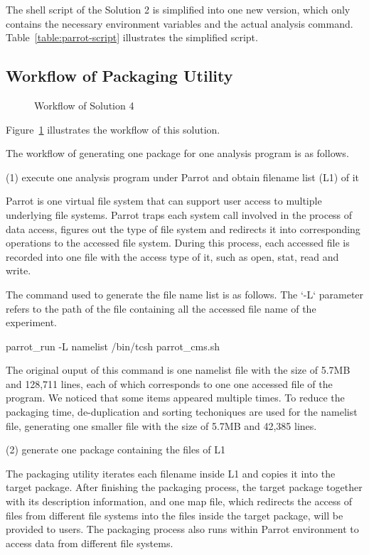 \documentclass{acm_proc_article-sp}
\begin{document}
The shell script of the Solution 2 is simplified into one new version, which
only contains the necessary environment variables and the
actual analysis command. Table~\ref{table:parrot-script} illustrates
the simplified script.

\subsection{Workflow of Packaging Utility}
\begin{figure}
\centering
{}
\caption{Workflow of Solution 4}
\label{fig:workflow-parrot}
\end{figure}

Figure~\ref{fig:workflow-parrot} illustrates the workflow of this solution.

The workflow of generating one package for one analysis program is as follows.

(1) execute one analysis program under Parrot and obtain filename list (L1) of it

Parrot is one virtual file system that can support user access to multiple underlying file systems. Parrot traps each system call involved in the process of data access, figures out the type of file system and redirects it into corresponding operations to the accessed file system. During this process, each accessed file is recorded into one file with the access type of it, such as open, stat, read and write.

The command used to generate the file name list is as follows. The `-L` parameter refers to the path of the file containing all the accessed file name of the experiment.

parrot\_run -L namelist /bin/tcsh parrot\_cms.sh

The original ouput of this command is one namelist file with the size of 5.7MB
and 128,711 lines, each of which corresponds to one one accessed file of the
program. We noticed that some items appeared multiple times. To reduce the
packaging time, de-duplication and sorting techoniques are used for the
namelist file, generating one smaller file with the size of 5.7MB and 42,385
lines.

(2) generate one package containing the files of L1 

The packaging utility iterates each filename inside L1 and copies it into the
target package. After finishing the packaging process, the target package
together with its description information, and one map file, which redirects
the access of files from different file systems into the files inside the target package, will be
provided to users. The packaging process also runs within Parrot environment to
access data from different file systems.
\end{document}
